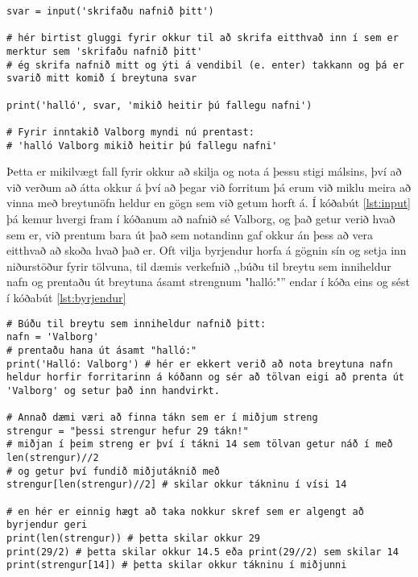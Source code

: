 \begin{lstlisting}[caption=input() fallið notað, label=lst:input]
svar = input('skrifaðu nafnið þitt')

# hér birtist gluggi fyrir okkur til að skrifa eitthvað inn í sem er merktur sem 'skrifaðu nafnið þitt'
# ég skrifa nafnið mitt og ýti á vendibil (e. enter) takkann og þá er svarið mitt komið í breytuna svar

print('halló', svar, 'mikið heitir þú fallegu nafni')

# Fyrir inntakið Valborg myndi nú prentast:
# 'halló Valborg mikið heitir þú fallegu nafni'
\end{lstlisting}

Þetta er mikilvægt fall fyrir okkur að skilja og nota á þessu stigi málsins, því að við verðum að átta okkur á því að þegar við forritum þá erum við miklu meira að vinna með breytunöfn heldur en gögn sem við getum horft á.
Í kóðabút \ref{lst:input} þá kemur hvergi fram í kóðanum að nafnið sé Valborg, og það getur verið hvað sem er, við prentum bara út það sem notandinn gaf okkur án þess að vera eitthvað að skoða hvað það er.
Oft vilja byrjendur horfa á gögnin sín og setja inn niðurstöður fyrir tölvuna, til dæmis verkefnið ,,búðu til breytu sem inniheldur nafn og prentaðu út breytuna ásamt strengnum "halló:"'' endar í kóða eins og sést í kóðabút \ref{lst:byrjendur}

\begin{lstlisting}[caption=Oft forðast byrjendur að nota breytur og treysta meira á að sjá hvað ætti að koma út, label=lst:byrjendur]
# Búðu til breytu sem inniheldur nafnið þitt:
nafn = 'Valborg'
# prentaðu hana út ásamt "halló:"
print('Halló: Valborg') # hér er ekkert verið að nota breytuna nafn heldur horfir forritarinn á kóðann og sér að tölvan eigi að prenta út 'Valborg' og setur það inn handvirkt.

# Annað dæmi væri að finna tákn sem er í miðjum streng
strengur = "þessi strengur hefur 29 tákn!"
# miðjan í þeim streng er því í tákni 14 sem tölvan getur náð í með len(strengur)//2
# og getur því fundið miðjutáknið með 
strengur[len(strengur)//2] # skilar okkur tákninu í vísi 14

# en hér er einnig hægt að taka nokkur skref sem er algengt að byrjendur geri
print(len(strengur)) # þetta skilar okkur 29
print(29/2) # þetta skilar okkur 14.5 eða print(29//2) sem skilar 14
print(strengur[14]) # þetta skilar okkur tákninu í miðjunni

\end{lstlisting}

